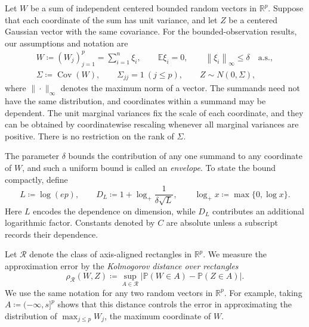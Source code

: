 \documentclass[11pt,letterpaper,twoside,leqno]{article}
\theoremstyle{bookplain}
\theoremstyle{bookremark}
\newcommand{\E}{\mathbb E}
\newcommand{\Pp}{\mathbb P}
\newcommand{\R}{\mathbb R}
\newcommand{\Cov}{\operatorname{Cov}}
\newcommand{\norm}[1]{\left\lVert#1\right\rVert}
\newcommand{\rh}{\rho_{\mathcal R}}
\begin{document}
Let \(W\) be a sum of independent centered bounded random vectors in
\(\R^p\). Suppose that each coordinate of the sum has unit variance,
and let \(Z\) be a centered Gaussian vector with the same covariance.
For the bounded-observation results, our assumptions and notation are
\begin{equation}
 \begin{gathered}
 W\coloneqq (W_j)_{j=1}^p=\sum_{i=1}^n\xi_i,\qquad
 \E\xi_i=0,\qquad \norm{\xi_i}_\infty\le\delta\quad\text{a.s.},\\
 \Sigma\coloneqq \Cov(W),\qquad\Sigma_{jj}=1\ (j\le p),
 \qquad Z\sim N(0,\Sigma),
 \end{gathered}
 \label{eq:setup}
\end{equation}
where $\|\cdot\|_\infty$ denotes the maximum norm of a vector. 
The summands need not have the same distribution, and coordinates within
a summand may be dependent. The unit marginal variances fix the scale
of each coordinate, and they can be obtained by coordinatewise rescaling
whenever all marginal variances are positive. There is no
restriction on the rank of \(\Sigma\).

The parameter \(\delta\) bounds the contribution of any one summand
to any coordinate of \(W\), and such a uniform bound is called an
\emph{envelope}. To state the
bound compactly, {define}
\[
 L\coloneqq \log(ep),\qquad
 D_L\coloneqq 1+\log_+\frac1{\delta\sqrt L},\qquad
 \log_+x\coloneqq \max\{0,\log x\}.
\]
Here \(L\) encodes the dependence on dimension, while \(D_L\)
contributes an additional logarithmic factor. Constants denoted by
\(C\) are absolute unless a subscript records their dependence.

Let \(\mathcal R\) denote the class of axis-aligned rectangles in
\(\R^p\). We measure the approximation error by the \emph{Kolmogorov distance over rectangles}
\[
 \rh(W,Z)\coloneqq \sup_{A\in\mathcal R}
       |\Pp(W\in A)-\Pp(Z\in A)|.
\]
We use the same notation for any two random vectors in \(\R^p\). For
example, taking \(A\coloneqq (-\infty,s]^p\) shows that this distance controls the
error in approximating the distribution of \(\max_{j\le p}W_j\), the maximum
coordinate of \(W\).
\end{document}
